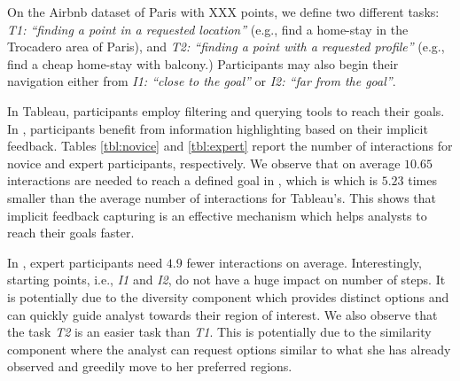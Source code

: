 \vspace{2pt}
On the Airbnb dataset of Paris with XXX points, we define two different tasks: {\em T1: ``finding a point in a requested location''} (e.g., find a home-stay in the Trocadero area of Paris), and {\em T2: ``finding a point with a requested profile''} (e.g., find a cheap home-stay with balcony.) Participants may also begin their navigation either from {\em I1: ``close to the goal''} or {\em I2: ``far from the goal''}. 

\vspace{2pt}
In {\sc Tableau}, participants employ filtering and querying tools to reach their goals. In \sgg, participants benefit from information highlighting based on their implicit feedback. Tables \ref{tbl:novice} and \ref{tbl:expert} report the number of interactions for novice and expert participants, respectively. We observe that on average $10.65$ interactions are needed to reach a defined goal in \sgg, which is  which is $5.23$ times smaller than the average number of interactions for {\sc Tableau}'s. This shows that implicit feedback capturing is an effective mechanism which helps analysts to reach their goals faster.

\vspace{2pt}
In \sgg, expert participants need $4.9$ fewer interactions on average. Interestingly, starting points, i.e., {\em I1} and {\em I2}, do not have a huge impact on number of steps. It is potentially due to the diversity component which provides distinct options and can quickly guide analyst towards their region of interest. We also observe that the task {\em T2} is an easier task than {\em T1}. This is potentially due to the similarity component where the analyst can request options similar to what she has already observed and greedily move to her preferred regions.

